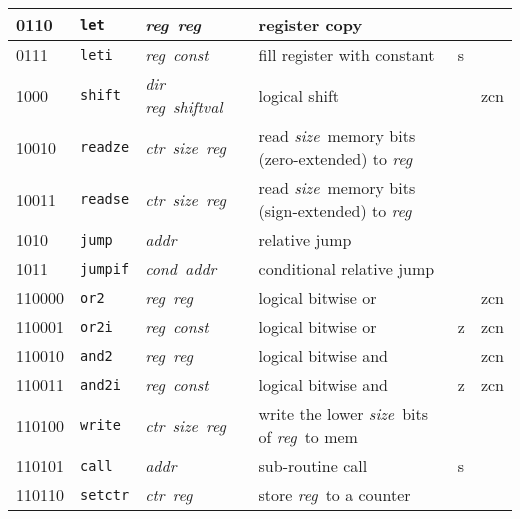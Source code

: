 \documentclass[architecture]{compas2018}
\newcommand{\reg}{\textit{reg}}
\newcommand{\const}{\textit{const}}
\newcommand{\shiftval}{\textit{shiftval}}
\newcommand{\cond}{\textit{cond}}
\newcommand{\ctr}{\textit{ctr}}
\newcommand{\size}{\textit{size}}
\newcommand{\addr}{\textit{addr}}
\begin{document}
\begin{table}[!h]
\begin{center}
\begin{tabular}{|l|l|l|l|l|c|}
    \hline
    0110    & \texttt{let}    & \reg\ \reg\                   & register copy                                        &      &             \\
    \hline
    0111    & \texttt{leti}   & \reg\ \const\                 & fill register with constant                          & s    &             \\
    \hline
    1000    & \texttt{shift}  & \textit{dir} \reg\ \shiftval\ & logical shift                                        &      & zcn         \\
    \hline
    10010   & \texttt{readze} & \ctr\ \size\ \reg\            & read \size\ memory bits (zero-extended) to \reg\     &      &             \\
    10011   & \texttt{readse} & \ctr\ \size\ \reg\            & read \size\ memory bits (sign-extended) to \reg\     &      &             \\
    \hline
    1010    & \texttt{jump}   & \addr\                        & relative jump                                        &      &             \\
    \hline
    1011    & \texttt{jumpif} & \cond\ \addr\                 & conditional relative jump                            &      &             \\
    \hline
    110000  & \texttt{or2}    & \reg\ \reg\                   & logical bitwise or                                   &      & zcn         \\
    \hline
    110001  & \texttt{or2i}   & \reg\ \const\                 & logical bitwise or                                   & {z}  & zcn         \\
    \hline
    110010  & \texttt{and2}   & \reg\ \reg\                   & logical bitwise and                                  &      & zcn         \\
    \hline
    110011  & \texttt{and2i}  & \reg\ \const\                 & logical bitwise and                                  & {z}  & zcn         \\
    \hline
    110100  & \texttt{write}  & \ctr\ \size\ \reg\            & write the lower \size\ bits of \reg\ to mem          &      &             \\
    \hline
    110101  & \texttt{call}   & \addr\                        & sub-routine call                                     & s    &             \\
    \hline
    110110  & \texttt{setctr} & \ctr\ \reg\                   & store \reg\ to a counter                             &      &             \\

\end{tabular}
\end{center}
\end{table}
\end{document}
